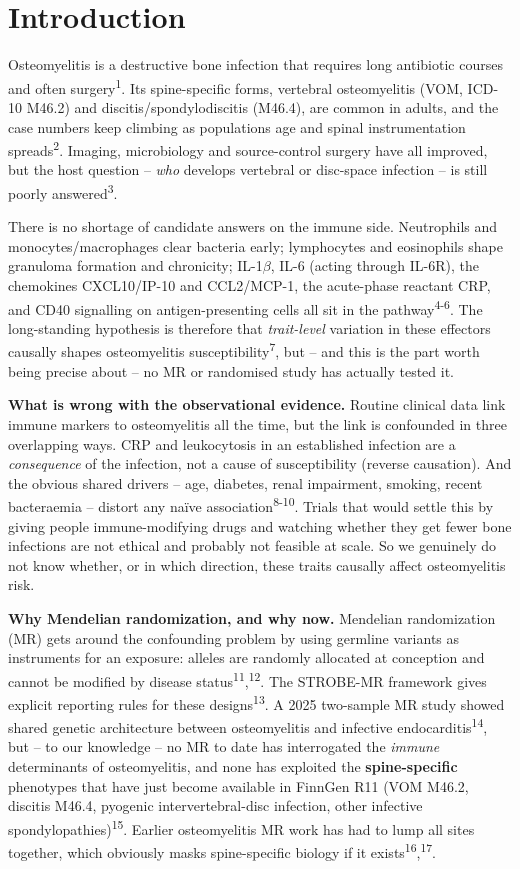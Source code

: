 \documentclass[11pt]{article}
\begin{document}
\section{Introduction}
Osteomyelitis is a destructive bone infection that requires long antibiotic courses and often surgery\textsuperscript{1}. Its spine-specific forms, vertebral osteomyelitis (VOM, ICD-10 M46.2) and discitis/spondylodiscitis (M46.4), are common in adults, and the case numbers keep climbing as populations age and spinal instrumentation spreads\textsuperscript{2}. Imaging, microbiology and source-control surgery have all improved, but the host question -- \emph{who} develops vertebral or disc-space infection -- is still poorly answered\textsuperscript{3}.

There is no shortage of candidate answers on the immune side. Neutrophils and monocytes/macrophages clear bacteria early; lymphocytes and eosinophils shape granuloma formation and chronicity; IL-1$\beta$, IL-6 (acting through IL-6R), the chemokines CXCL10/IP-10 and CCL2/MCP-1, the acute-phase reactant CRP, and CD40 signalling on antigen-presenting cells all sit in the pathway\textsuperscript{4-6}. The long-standing hypothesis is therefore that \emph{trait-level} variation in these effectors causally shapes osteomyelitis susceptibility\textsuperscript{7}, but -- and this is the part worth being precise about -- no MR or randomised study has actually tested it.

\textbf{What is wrong with the observational evidence.} Routine clinical data link immune markers to osteomyelitis all the time, but the link is confounded in three overlapping ways. CRP and leukocytosis in an established infection are a \emph{consequence} of the infection, not a cause of susceptibility (reverse causation). And the obvious shared drivers -- age, diabetes, renal impairment, smoking, recent bacteraemia -- distort any naïve association\textsuperscript{8-10}. Trials that would settle this by giving people immune-modifying drugs and watching whether they get fewer bone infections are not ethical and probably not feasible at scale. So we genuinely do not know whether, or in which direction, these traits causally affect osteomyelitis risk.

\textbf{Why Mendelian randomization, and why now.} Mendelian randomization (MR) gets around the confounding problem by using germline variants as instruments for an exposure: alleles are randomly allocated at conception and cannot be modified by disease status\textsuperscript{11},\textsuperscript{12}. The STROBE-MR framework gives explicit reporting rules for these designs\textsuperscript{13}. A 2025 two-sample MR study showed shared genetic architecture between osteomyelitis and infective endocarditis\textsuperscript{14}, but -- to our knowledge -- no MR to date has interrogated the \emph{immune} determinants of osteomyelitis, and none has exploited the \textbf{spine-specific} phenotypes that have just become available in FinnGen R11 (VOM M46.2, discitis M46.4, pyogenic intervertebral-disc infection, other infective spondylopathies)\textsuperscript{15}. Earlier osteomyelitis MR work has had to lump all sites together, which obviously masks spine-specific biology if it exists\textsuperscript{16},\textsuperscript{17}.
\end{document}
